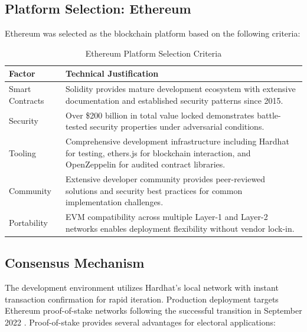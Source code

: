 \documentclass[conference]{IEEEtran}
\begin{document}
\subsection{Platform Selection: Ethereum}

Ethereum was selected as the blockchain platform based on the following criteria:

\begin{table}[htbp]
\caption{Ethereum Platform Selection Criteria}
\centering
\begin{tabular}{|p{2cm}|p{5.5cm}|}
\hline
\textbf{Factor} & \textbf{Technical Justification} \\
\hline
Smart Contracts & Solidity provides mature development ecosystem with extensive documentation and established security patterns since 2015. \\
\hline
Security & Over \$200 billion in total value locked demonstrates battle-tested security properties under adversarial conditions. \\
\hline
Tooling & Comprehensive development infrastructure including Hardhat for testing, ethers.js for blockchain interaction, and OpenZeppelin for audited contract libraries. \\
\hline
Community & Extensive developer community provides peer-reviewed solutions and security best practices for common implementation challenges. \\
\hline
Portability & EVM compatibility across multiple Layer-1 and Layer-2 networks enables deployment flexibility without vendor lock-in. \\
\hline
\end{tabular}
\label{tab:platform}
\end{table}

\subsection{Consensus Mechanism}

The development environment utilizes Hardhat's local network with instant transaction confirmation for rapid iteration. Production deployment targets Ethereum proof-of-stake networks following the successful transition in September 2022 \cite{ethereum_pos}. Proof-of-stake provides several advantages for electoral applications:
\end{document}
